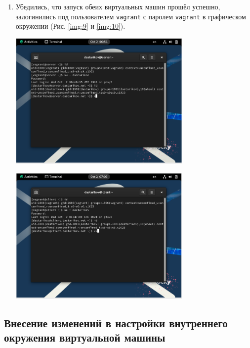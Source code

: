 \begin{enumerate}
\begin{center}
        \label{img:8}
    \end{center}
    \item Убедились, что запуск обеих виртуальных машин прошёл успешно, залогинились под пользователем \texttt{vagrant} с паролем \texttt{vagrant} в графическом окружении (Рис. \ref{img:9} и \ref{img:10}).
    \begin{center}
        \centering
        \includegraphics[width=0.7\textwidth]{../images/img9.png}
        \label{img:9}
    \end{center}
    \begin{center}
        \centering
        \includegraphics[width=0.7\textwidth]{../images/img10.png}
        \label{img:10}
    \end{center}
\end{enumerate}

\subsection{Внесение изменений в настройки внутреннего окружения виртуальной машины}

